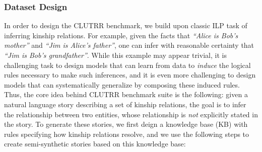 \documentclass[12pt]{article}
\begin{document}
\subsubsection{Dataset Design}

In order to design the CLUTRR benchmark, we build upon classic ILP task of inferring kinship relations. For example, given the facts that \textit{``Alice is Bob's mother''} and \textit{``Jim is Alice's father''}, one can infer with reasonable certainty that \textit{``Jim is Bob's grandfather''}. While this example may appear trivial, it is challenging task to design models that can learn from data to \textit{induce} the logical rules necessary to make such inferences, and it is even more challenging to design models that can systematically generalize by composing these induced rules. Thus, the core idea behind CLUTRR benchmark suite is the following: given a natural language story describing a set of kinship relations, the goal is to infer the relationship between two entities, whose relationship is \textit{not} explicitly stated in the story. To generate these stories, we first deign a knowledge base (KB) with rules specifying how kinship relations resolve, and we use the following steps to create semi-synthetic stories based on this knowledge base:
\end{document}

